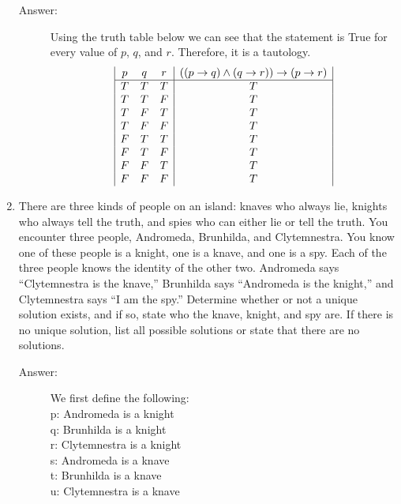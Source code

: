 \documentclass[12pt, oneside]{article}
\begin{document}
\begin{enumerate}
\begin{description}
    \item[Answer:] Using the truth table below we can see that the statement is True for every value of $p$, $q$, and $r$. Therefore, it is a tautology.\\
    \begin{displaymath}
        \begin{array}{|c c c|c|}
        p & q & r & ((p \to q ) \land (q \to r)) \to (p \to r)\\
        \hline
        T & T & T & T\\
        T & T & F & T\\
        T & F & T & T\\
        T & F & F & T\\
        F & T & T & T\\
        F & T & F & T\\
        F & F & T & T\\
        F & F & F & T\\
        \end{array}
    \end{displaymath}
\end{description}

\item There are three kinds of people on an island: knaves who always lie, knights who always tell the truth, and spies who can either lie or tell the truth. You encounter three people, Andromeda, Brunhilda, and Clytemnestra. You know one of these people is a knight, one is a knave, and one is a spy. Each of the three people knows the identity of the other two. Andromeda says “Clytemnestra is the knave,” Brunhilda says “Andromeda is the knight,” and Clytemnestra says “I am the spy.” Determine whether or not a unique solution exists, and if so, state who the knave, knight, and spy are. If there is no unique solution, list all possible solutions or state that there are no solutions.

\begin{description}
    \item[Answer:]  We first define the following:\\
    p: Andromeda is a knight\\  
    q: Brunhilda is a knight\\
    r: Clytemnestra is a knight\\
    s: Andromeda is a knave\\
    t: Brunhilda is a knave\\
    u: Clytemnestra is a knave\\\\


\end{description}
\end{enumerate}
\end{document}

